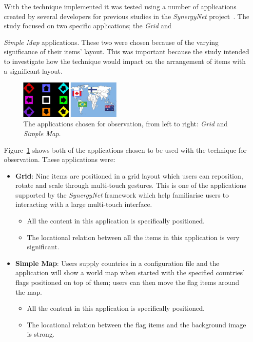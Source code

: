 \documentclass[twocolumn,compsoc]{cvm}
\begin{document}
With the technique implemented it was tested using a number of applications created by several developers for previous studies in the {\emph{SynergyNet}} project~\cite{higgins2011}.
The study focused on two specific applications; the {\emph{Grid}} and {\emph{Simple Map} applications.
These two were chosen because of the varying significance of their items' layout.
This was important because the study intended to investigate how the technique would impact on the arrangement of items with a significant layout.

\begin{figure}[h!] 
 \centering
  \includegraphics[width=0.45\textwidth]{figures/Applications.jpeg}
  \caption{The applications chosen for observation, from left to right:  {\emph{Grid}} and {\emph{Simple Map}}.}
  \label{fig:apps}
\end{figure}

Figure~\ref{fig:apps} shows both of the applications chosen to be used with the technique for observation.
These applications were:\\

\begin{itemize}
  \item \textbf{Grid}: 
  Nine items are positioned in a grid layout which users can reposition, rotate and scale through multi-touch gestures.
  This is one of the applications supported by the {\emph{SynergyNet}} framework which help familiarise users to interacting with a large multi-touch interface. 
    \begin{itemize}
    \item  All the content in this application is specifically positioned.
    \item The locational relation between all the items in this application is very significant.
  \end{itemize}
    \item \textbf{Simple Map}: 
  Users supply countries in a configuration file and the application will show a world map when started with the specified countries' flags positioned on top of them; users can then move the flag items around the map.
    \begin{itemize}
    \item  All the content in this application is specifically positioned.
    \item The locational relation between the flag items and the background image is strong.
  \end{itemize}
\end{itemize}


}
\end{document}
